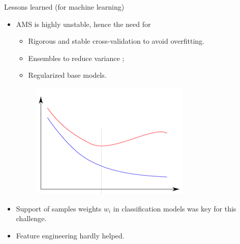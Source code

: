 \documentclass{beamer}
\newcommand{\w}[1]{\textcolor{mygreen}{#1}}
\begin{document}

\begin{frame}{Lessons learned (for machine learning)}

\begin{itemize}
\item AMS is {\color{red} highly unstable}, hence the need for
    \begin{itemize}
        \item Rigorous and stable cross-validation to avoid overfitting.
        \item Ensembles to reduce variance ;
        \item Regularized base models.
    \end{itemize}


\begin{figure}
\includegraphics[scale=0.3]{./figures/overfitting.png}
\end{figure}

\item Support of samples weights \w{$w_i$} in classification models
      was key for this challenge.

\vspace{0.5cm}

\item Feature engineering hardly helped.

\end{itemize}

\end{frame}
\end{document}
